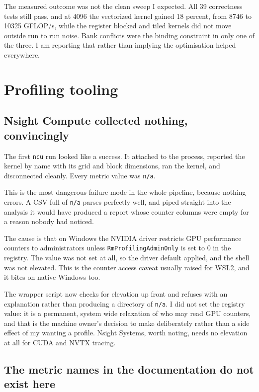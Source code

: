 ﻿\documentclass[11pt]{article}
\begin{document}
The measured outcome was not the clean sweep I expected. All 39 correctness tests
still pass, and at 4096 the vectorized kernel gained 18 percent, from 8746 to
10325 GFLOP/s, while the register blocked and tiled kernels did not move outside
run to run noise. Bank conflicts were the binding constraint in only one of the
three. I am reporting that rather than implying the optimisation helped
everywhere.

\section{Profiling tooling}

\subsection{Nsight Compute collected nothing, convincingly}

The first \texttt{ncu} run looked like a success. It attached to the process,
reported the kernel by name with its grid and block dimensions, ran the kernel,
and disconnected cleanly. Every metric value was \texttt{n/a}.

This is the most dangerous failure mode in the whole pipeline, because nothing
errors. A CSV full of \texttt{n/a} parses perfectly well, and piped straight into
the analysis it would have produced a report whose counter columns were empty for
a reason nobody had noticed.

The cause is that on Windows the NVIDIA driver restricts GPU performance counters
to administrators unless \texttt{RmProfilingAdminOnly} is set to 0 in the
registry. The value was not set at all, so the driver default applied, and the
shell was not elevated. This is the counter access caveat usually raised for
WSL2, and it bites on native Windows too.

The wrapper script now checks for elevation up front and refuses with an
explanation rather than producing a directory of \texttt{n/a}. I did not set the
registry value: it is a permanent, system wide relaxation of who may read GPU
counters, and that is the machine owner's decision to make deliberately rather
than a side effect of my wanting a profile. Nsight Systems, worth noting, needs no
elevation at all for CUDA and NVTX tracing.

\subsection{The metric names in the documentation do not exist here}
\end{document}
